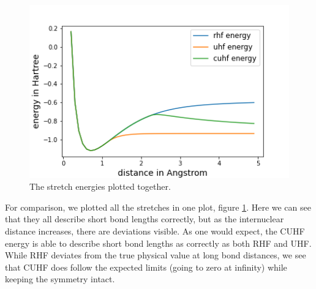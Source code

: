 \documentclass[twoside,twocolumn,9pt]{article}
\begin{document}
\begin{center}
  \begin{figure}[h]
    \includegraphics[width=\linewidth]{./../notes/figures/combo.png}
    \caption{The stretch energies plotted together.}
    \label{fig:combo}
  \end{figure}
\end{center}
For comparison, we plotted all the stretches in one plot, figure \ref{fig:combo}. Here we can see that they all describe short bond lengths correctly, but as the internuclear distance
increases, there are deviations visible. As one would expect, the CUHF energy is able to describe short bond lengths as correctly as both RHF and UHF. While RHF deviates from the
true physical value at long bond distances, we see that CUHF does follow the expected limits (going to zero at infinity) while keeping the symmetry intact. 
\end{document}
